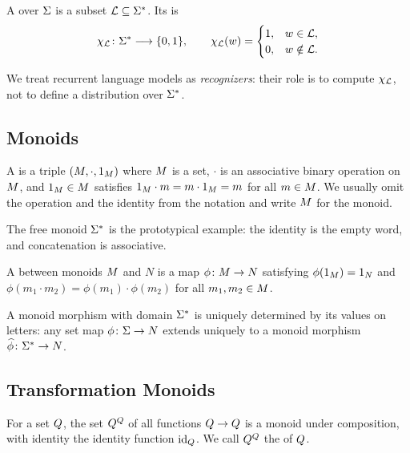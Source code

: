 \documentclass{article}
\begin{document}
\begin{definition}
A  over $\Sigma$ is a subset $\mathcal{L} \subseteq \Sigma^*$. 
Its  is
$$
\chi_{\mathcal{L}} \colon \Sigma^* \longrightarrow \{0,1\},
\qquad
\chi_{\mathcal{L}}(w) = \begin{cases} 1, & w \in \mathcal{L}, \\ 0, & w \notin \mathcal{L}. \end{cases}
$$
\end{definition}

We treat recurrent language models as \emph{recognizers}: their role is to compute $\chi_{\mathcal{L}}$, not to define a distribution over $\Sigma^*$.

\subsection{Monoids}

\begin{definition}
A  is a triple $(M, \cdot, 1_M)$ where $M$ is a set, $\cdot$ is an associative binary operation on $M$, and $1_M \in M$ satisfies $1_M \cdot m = m \cdot 1_M = m$ for all $m \in M$. We usually omit the operation and the identity from the notation and write $M$ for the monoid.
\end{definition}

The free monoid $\Sigma^*$ is the prototypical example: the identity is the empty word, and concatenation is associative.

\begin{definition}
A  between monoids $M$ and $N$ is a map $\phi \colon M \to N$ satisfying $\phi(1_M) = 1_N$ and $\phi(m_1 \cdot m_2) = \phi(m_1) \cdot \phi(m_2)$ for all $m_1, m_2 \in M$.
\end{definition}

A monoid morphism with domain $\Sigma^*$ is uniquely determined by its values on letters: any set map $\phi \colon \Sigma \to N$ extends uniquely to a monoid morphism $\widehat{\phi}\colon\Sigma^* \to N$.

\subsection{Transformation Monoids}

\begin{definition}
For a set $Q$, the set $Q^Q$ of all functions $Q \to Q$ is a monoid under composition, with identity the identity function $\mathrm{id}_{Q}$. 
We call $Q^Q$ the  of $Q$.
\end{definition}
\end{document}
